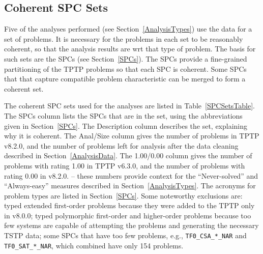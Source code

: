 \documentclass[runningheads]{llncs}
\begin{document}
\subsection{Coherent SPC Sets}
\label{SPCSets}

Five of the analyses performed (see Section~\ref{AnalysisTypes}) use the data for a set of 
problems.
It is necessary for the problems in each set to be 
reasonably coherent, so that the analysis results are wrt that type of problem.
The basis for such sets are the SPCs (see Section~\ref{SPCs}).
The SPCs provide a fine-grained partitioning of the TPTP problems so that each SPC is coherent.
Some SPCs that that capture compatible problem characteristic can be merged to form a coherent set.

The coherent SPC sets used for the analyses are listed in Table~\ref{SPCSetsTable}.
The SPCs column lists the SPCs that are in the set, using the abbreviations given in 
Section~\ref{SPCs}.
The Description column describes the set, explaining why it is coherent.
The Anal/Size column gives the number of problems in TPTP v8.2.0, and the number of problems 
left for analysis after the data cleaning described in Section~\ref{AnalysisData}.
The 1.00/0.00 column gives the number of problems with rating 1.00 in TPTP v6.3.0, and the number
of problems with rating 0.00 in v8.2.0. -- these numbers provide context for the ``Never-solved'' 
and ``Always-easy'' measures described in Section~\ref{AnalysisTypes}.
The acronyms for problem types are listed in Section~\ref{SPCs}.
Some noteworthy exclusions are:
typed extended first-order problems because they were added to the TPTP only in v8.0.0;
typed polymorphic first-order and higher-order problems because too few systems are 
capable of attempting the problems and generating the necessary TSTP data;
some SPCs that have too few problems, e.g., {\tt TF0\_CSA\_*\_NAR} and {\tt TF0\_SAT\_*\_NAR},
which combined have only 154 problems.
\end{document}
